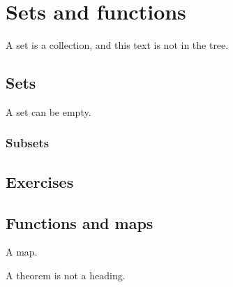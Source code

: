 \chapter{Sets and
  functions}\label{ch:sets}
A set is a collection, and this text is not in the tree.
\section{Sets}
A set can be empty.
\subsection{Subsets}
\section*{Exercises}
\section[Maps]{Functions and maps}
A map.
\begin{theorem}
A theorem is not a heading.
\end{theorem}
